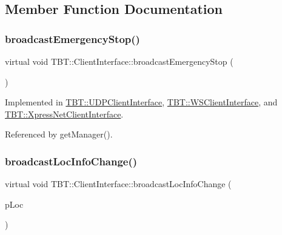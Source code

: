 \subsection{Member Function Documentation}
\mbox{\label{classTBT_1_1ClientInterface_a8d19220baccb47a7c9f45d0288bebcb8_a8d19220baccb47a7c9f45d0288bebcb8}} 
\subsubsection{\texorpdfstring{broadcast\+Emergency\+Stop()}{broadcastEmergencyStop()}}
{\footnotesize\ttfamily virtual void T\+B\+T\+::\+Client\+Interface\+::broadcast\+Emergency\+Stop (\begin{DoxyParamCaption}\item[{void}]{ }\end{DoxyParamCaption})\hspace{0.3cm}{\ttfamily [pure virtual]}}



Implemented in \hyperlink{classTBT_1_1UDPClientInterface_a33a0c51d141a457cda9dacc4d82d5304_a33a0c51d141a457cda9dacc4d82d5304}{T\+B\+T\+::\+U\+D\+P\+Client\+Interface}, \hyperlink{classTBT_1_1WSClientInterface_a2ad439e557711c57c8a978e3b6efcb62_a2ad439e557711c57c8a978e3b6efcb62}{T\+B\+T\+::\+W\+S\+Client\+Interface}, and \hyperlink{classTBT_1_1XpressNetClientInterface_a143641241f4830f22ec5beb78036ce4c_a143641241f4830f22ec5beb78036ce4c}{T\+B\+T\+::\+Xpress\+Net\+Client\+Interface}.



Referenced by get\+Manager().

\mbox{\label{classTBT_1_1ClientInterface_aaede3709fa0dcb23743f43d9c1a5ab04_aaede3709fa0dcb23743f43d9c1a5ab04}} 
\subsubsection{\texorpdfstring{broadcast\+Loc\+Info\+Change()}{broadcastLocInfoChange()}}
{\footnotesize\ttfamily virtual void T\+B\+T\+::\+Client\+Interface\+::broadcast\+Loc\+Info\+Change (\begin{DoxyParamCaption}\item[{\hyperlink{classTBT_1_1LocDecoder}{Loc\+Decoder} $\ast$}]{p\+Loc }\end{DoxyParamCaption})\hspace{0.3cm}{\ttfamily [pure virtual]}}



